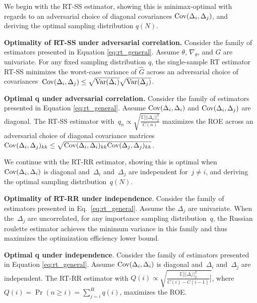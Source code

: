 We begin with the RT-SS estimator, showing this is minimax-optimal with regards to an adversarial choice of diagonal covariances $\mathrm{Cov}(\Delta_i, \Delta_j)$, and deriving the optimal sampling distribution $q(N)$.
\begin{theorem}\label{thm:advcorr-w} \textbf{Optimality of RT-SS under adversarial correlation.}
Consider the family of estimators presented in Equation  \ref{eq:rt_general}.
Assume $\theta$, $\nabla_\theta$, and $G$ are univariate.
For any fixed sampling distribution $q$, the single-sample RT estimator RT-SS minimizes the worst-case variance of $\hat{G}$ across an adversarial choice of covariances~${\mathrm{Cov}(\Delta_i, \Delta_j) \leq \sqrt{\mathrm{Var}(\Delta_i)} \sqrt{\mathrm{Var}(\Delta_j)}}$.
\end{theorem}

\begin{theorem}\label{thm:advcorr-q} \textbf{Optimal q under adversarial correlation.}
Consider the family of estimators presented in Equation  \ref{eq:rt_general}.
Assume $\mathrm{Cov}(\Delta_i, \Delta_i)$ and $\mathrm{Cov}(\Delta_i, \Delta_j)$ are diagonal.
The RT-SS estimator with~${q_n \propto \sqrt{\frac{\mathbb{E}[||\Delta_n||_2^2}{C(n)}}}$ maximizes the ROE across an adversarial choice of diagonal covariance matrices~${\mathrm{Cov}(\Delta_i, \Delta_j)_{kk} \leq \sqrt{\mathrm{Cov}(\Delta_i, \Delta_i)_{kk} \mathrm{Cov}(\Delta_j, \Delta_j)_{kk}}}$.
\end{theorem}
We continue with the RT-RR estimator, showing this is optimal when~$\mathrm{Cov}(\Delta_i, \Delta_i)$ is diagonal and~$\Delta_i$ and~$\Delta_j$ are independent for~${j \neq i}$, and deriving the optimal sampling distribution~$q(N)$.

\begin{theorem}\label{thm:nocorr-w} \textbf{Optimality of RT-RR under independence}.
Consider the family of estimators presented in Eq.~\ref{eq:rt_general}.
Assume the $\Delta_j$ are univariate.
When the~$\Delta_j$ are uncorrelated, for any importance sampling distribution~$q$, the Russian roulette estimator achieves the minimum variance in this family and thus maximizes the optimization efficiency lower bound.
\end{theorem}
\begin{theorem}\label{thm:nocorr-q} \textbf{Optimal q under independence}.
Consider the family of estimators presented in Equation  \ref{eq:rt_general}.
Assume $\mathrm{Cov}(\Delta_i, \Delta_i)$ is diagonal and~$\Delta_i$ and~$\Delta_j$ are independent.
The RT-RR estimator with
$Q(i) \propto \sqrt{\frac{\mathbb{E} [||\Delta_i||_2^2}{C(i) - C(i-1)}]}$,
where $Q(i) = \Pr(n \geq i) = \sum_{j=i}^H q(i)$,
maximizes the ROE.
\end{theorem}


